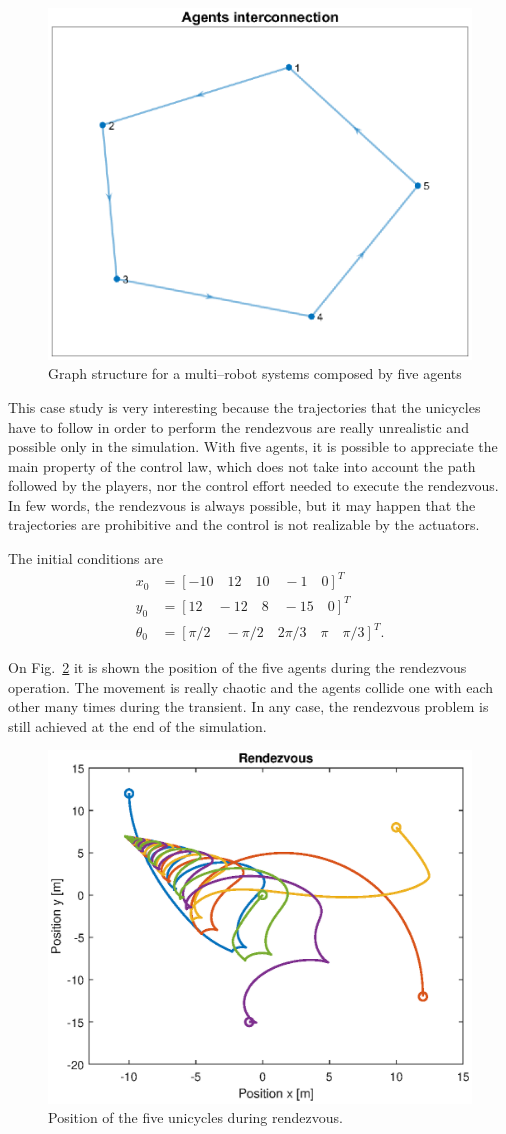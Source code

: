 \documentclass[11pt]{article}
\begin{document}
\begin{figure}[H]
\centering
\includegraphics[width=.6\textwidth]{Images/5agents/Graph}
\caption{Graph structure for a multi--robot systems composed by five agents}
\label{graph_5}
\end{figure}

This case study is very interesting because the trajectories that the unicycles have to follow in order to perform the rendezvous are really unrealistic and possible only in the simulation. With five agents, it is possible to appreciate the main property of the control law, which does not take into account the path followed by the players, nor the control effort needed to execute the rendezvous. In few words, the rendezvous is always possible, but it may happen that the trajectories are prohibitive and the control is not realizable by the actuators. 

The initial conditions are 
\[
\begin{split}
x_0 & = [-10 \quad 12 \quad 10 \quad -1 \quad 0]^T \\
y_0 & = [12 \quad -12 \quad 8 \quad -15 \quad 0]^T \\ 
\theta_0 & = [\pi/2 \quad -\pi/2 \quad 2\pi/3 \quad \pi \quad \pi/3]^T.
\end{split}
\]

On Fig.~\ref{pos_rendez_5} it is shown the position of the five agents during the rendezvous operation. The movement is really chaotic and the agents collide one with each other many times during the transient. In any case, the rendezvous problem is still achieved at the end of the simulation.

\begin{figure}[H]
\centering
\includegraphics[width=.6\textwidth]{Images/5agents/Position_Rendezvous}
\caption{Position of the five unicycles during rendezvous.}
\label{pos_rendez_5}
\end{figure}
\end{document}
